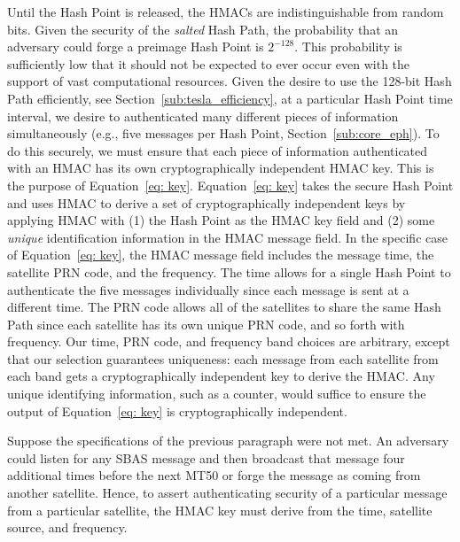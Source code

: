 \documentclass[letterpaper,times]{IONconf/IONconf}
\begin{document}
		Until the Hash Point is released, the HMACs are indistinguishable from random bits.
		Given the security of the {\em salted} Hash Path, the probability that an adversary could forge a preimage Hash Point is $2^{-128}$.
		This probability is sufficiently low that it should not be expected to ever occur even with the support of vast computational resources.
		Given the desire to use the 128-bit Hash Path efficiently, see Section~\ref{sub:tesla_efficiency}, at a particular Hash Point time interval, we desire to authenticated many different pieces of information simultaneously (e.g., five messages per Hash Point, Section~\ref{sub:core_eph}).
		To do this securely, we must ensure that each piece of information authenticated with an HMAC has its own cryptographically independent HMAC key.
		This is the purpose of Equation~\eqref{eq: key}.
		Equation~\eqref{eq: key} takes the secure Hash Point and uses HMAC to derive a set of cryptographically independent keys by applying HMAC with (1) the Hash Point as the HMAC key field and (2) some {\em unique} identification information in the HMAC message field.
		In the specific case of Equation~\eqref{eq: key}, the HMAC message field includes the message time, the satellite PRN code, and the frequency.
		The time allows for a single Hash Point to authenticate the five messages individually since each message is sent at a different time.
		The PRN code allows all of the satellites to share the same Hash Path since each satellite has its own unique PRN code, and so forth with frequency.
		Our time, PRN code, and frequency band choices are arbitrary, except that our selection guarantees uniqueness: each message from each satellite from each band gets a cryptographically independent key to derive the HMAC.
		Any unique identifying information, such as a counter, would suffice to ensure the output of Equation~\eqref{eq: key} is cryptographically independent.

		Suppose the specifications of the previous paragraph were not met.
		An adversary could listen for any SBAS message and then broadcast that message four additional times before the next MT50 or forge the message as coming from another satellite.
		Hence, to assert authenticating security of a particular message from a particular satellite, the HMAC key must derive from the time, satellite source, and frequency.
\end{document}
